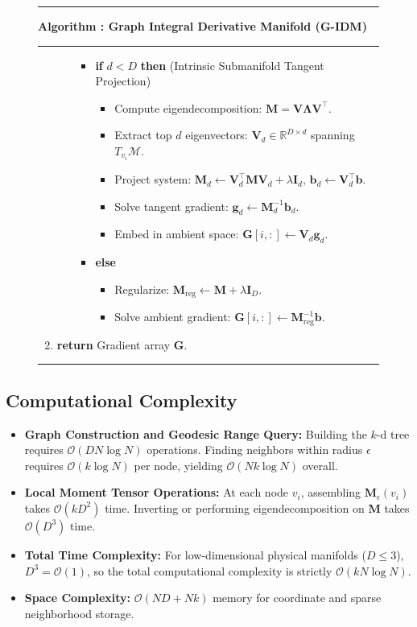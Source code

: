 \documentclass[11pt,a4paper]{article}
\newcounter{algocounter}
\newenvironment{algorithmbox}[2][htbp]{%
  \refstepcounter{algocounter}%
  \begin{figure}[#1]%
  \hrule height 1pt%
  \vspace{0.4em}%
  \noindent\textbf{Algorithm \thealgocounter: #2}%
  \vspace{0.4em}%
  \hrule height 0.5pt%
  \vspace{0.5em}%
  \small%
}{%
  \vspace{0.5em}%
  \hrule height 1pt%
  \end{figure}%
}
\theoremstyle{definition}
\begin{document}
\begin{algorithmbox}{Graph Integral Derivative Manifold (G-IDM)}
\begin{enumerate}
\begin{itemize}
\begin{itemize}
            \item \textbf{if} $d < D$ \textbf{then} (Intrinsic Submanifold Tangent Projection)
            \begin{itemize}
                \item Compute eigendecomposition: $\mathbf{M} = \mathbf{V} \mathbf{\Lambda} \mathbf{V}^\top$.
                \item Extract top $d$ eigenvectors: $\mathbf{V}_d \in \mathbb{R}^{D \times d}$ spanning $T_{v_i}\mathcal{M}$.
                \item Project system: $\mathbf{M}_d \gets \mathbf{V}_d^\top \mathbf{M} \mathbf{V}_d + \lambda \mathbf{I}_d$, $\mathbf{b}_d \gets \mathbf{V}_d^\top \mathbf{b}$.
                \item Solve tangent gradient: $\mathbf{g}_d \gets \mathbf{M}_d^{-1} \mathbf{b}_d$.
                \item Embed in ambient space: $\mathbf{G}[i, :] \gets \mathbf{V}_d \mathbf{g}_d$.
            \end{itemize}
            \item \textbf{else}
            \begin{itemize}
                \item Regularize: $\mathbf{M}_{\text{reg}} \gets \mathbf{M} + \lambda \mathbf{I}_D$.
                \item Solve ambient gradient: $\mathbf{G}[i, :] \gets \mathbf{M}_{\text{reg}}^{-1} \mathbf{b}$.
            \end{itemize}
        \end{itemize}
    \end{itemize}
    \item \textbf{return} Gradient array $\mathbf{G}$.
\end{enumerate}
\end{algorithmbox}

\subsection{Computational Complexity}
\begin{itemize}
    \item \textbf{Graph Construction and Geodesic Range Query:} Building the $k$-d tree requires $\mathcal{O}(D N \log N)$ operations. Finding neighbors within radius $\epsilon$ requires $\mathcal{O}(k \log N)$ per node, yielding $\mathcal{O}(N k \log N)$ overall.
    \item \textbf{Local Moment Tensor Operations:} At each node $v_i$, assembling $\mathbf{M}_\epsilon(v_i)$ takes $\mathcal{O}(k D^2)$ time. Inverting or performing eigendecomposition on $\mathbf{M}$ takes $\mathcal{O}(D^3)$ time. 
    \item \textbf{Total Time Complexity:} For low-dimensional physical manifolds ($D \le 3$), $D^3 = \mathcal{O}(1)$, so the total computational complexity is strictly $\mathcal{O}(k N \log N)$.
    \item \textbf{Space Complexity:} $\mathcal{O}(N D + N k)$ memory for coordinate and sparse neighborhood storage.
\end{itemize}
\end{document}
